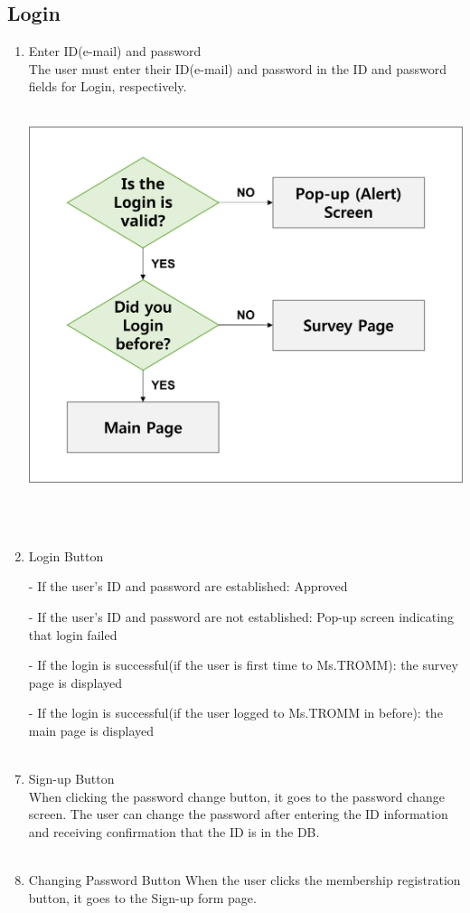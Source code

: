 \documentclass[conference]{IEEEtran}
\begin{document}
\subsection{Login}
\begin{enumerate}
    \item Enter ID(e-mail) and password\\
        The user must enter their ID(e-mail) and password in the ID and password fields for Login, respectively. \\ \\
    \centerline{\includegraphics[scale=0.5]{assets/flow_2.png}} \\ \\
    \item Login Button\\
        \item[-] If the user’s ID and password are established: Approved\\
        \item[-] If the user’s ID and password are not established: Pop-up screen indicating that login failed\\
        \item[-] If the login is successful(if the user is first time to Ms.TROMM): the survey page is displayed\\
        \item[-] If the login is successful(if the user logged to Ms.TROMM in before): the main page is displayed\\ \\
    \item Sign-up Button\\
        When clicking the password change button, it goes to the password change screen. The user can change the password after entering the ID information and receiving confirmation that the ID is in the DB.\\ \\
    \item Changing Password Button
        When the user clicks the membership registration button, it goes to the Sign-up form page. 
\end{enumerate}
\end{document}
